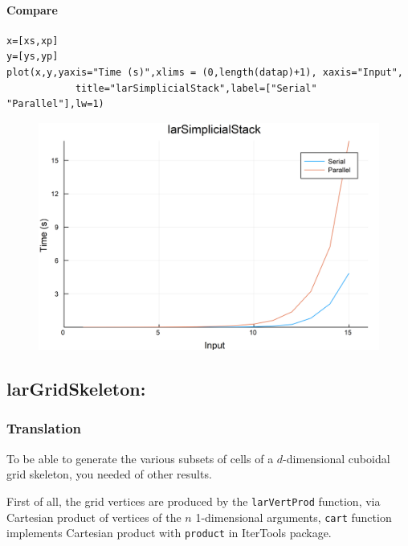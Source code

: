 \documentclass{article}
\begin{document}
\paragraph{Compare}

\begin{flushleft}\small
\begin{list}{}{} \item
    \begin{Verbatim}[tabsize=4]
x=[xs,xp]
y=[ys,yp]
plot(x,y,yaxis="Time (s)",xlims = (0,length(datap)+1), xaxis="Input",
            title="larSimplicialStack",label=["Serial" "Parallel"],lw=1)
    \end{Verbatim}
\end{list}
\end{flushleft}   
\begin{figure}[h!]
\centering
\includegraphics[scale=0.06]{larSimplicialStackCom.png}
\end{figure}

\subsection{larGridSkeleton:}

\subsubsection{Translation}
To be able to generate the various subsets of cells of a $d$-dimensional cuboidal grid skeleton, you needed of other results. 

First of all, the grid vertices are produced by the \texttt{larVertProd} function, via Cartesian product of
vertices of the $n$ 1-dimensional arguments, \texttt{cart} function implements Cartesian product with \texttt{product} in IterTools package.
\end{document}
